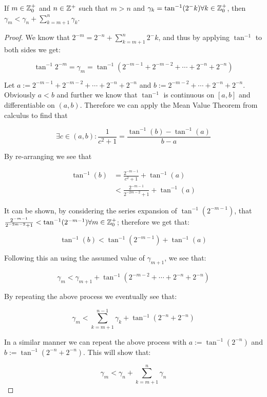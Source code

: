 {%
\begin{Cordic Gamma Property}
\label{THM_"Cordic Gamma Property"}
If \(m \in \mathbb{Z}^+_0\) and \(n \in \mathbb{Z}^+\) such that \(m > n\) and \(\gamma_k = \tan^{-1}(2^-k) \forall k \in \mathbb{Z}^+_0\), then \(\gamma_m < \gamma_n + \sum_{k=m+1}^n \gamma_k\).
\end{Cordic Gamma Property}
\begin{proof}
We know that \(2^{-m} = 2^{-n} + \sum_{k=m+1}^n 2^-k\), and thus by applying \(\tan^{-1}\) to both sides we get:

\[\tan^{-1} 2^{-m} = \gamma_m = \tan^{-1}(2^{-m-1} + 2^{-m-2} + \cdots + 2^{-n} + 2^{-n})\]

Let \(a := 2^{-m-1} + 2^{-m-2} + \cdots + 2^{-n} + 2^{-n}\) and \(b := 2^{-m-2} + \cdots + 2^{-n} + 2^{-n}\). Obviously \(a < b\) and further we know that \(\tan^{-1}\) is continuous on \([a,b]\) and differentiable on \((a,b)\). Therefore we can apply the Mean Value Theorem from calculus to find that 

\[\exists c \in (a,b) : \frac{1}{c^2 + 1} = \frac{\tan^{-1}(b) - \tan^{-1}(a)}{b-a}\]

By re-arranging we see that 

\begin{align*}
	\tan^{-1}(b) &= \frac{2^{-m-1}}{c^2 + 1} + \tan^{-1}(a)\\
		&< \frac{2^{-m-1}}{2^{-2m-2} + 1} + \tan^{-1}(a)
\end{align*}

It can be shown, by considering the series expansion of \(\tan^{-1}(2^{-m-1})\), that \(\frac{2^{-m-1}}{2^{-2m-2} + 1} < \tan^{-1}(2^{-m-1}) \forall m \in \mathbb{Z}^+_0\); therefore we get that:

\[\tan^{-1}(b) < \tan^{-1}(2^{-m-1}) + \tan^{-1}(a)\]

Following this an using the assumed value of \(\gamma_{m+1}\), we see that:

\[\gamma_m < \gamma_{m+1} + \tan^{-1}(2^{-m-2} + \cdots + 2^{-n} + 2^{-n})\]

By repeating the above process we eventually see that:

\[\gamma_m < \sum_{k=m+1}^{n-1} \gamma_k + \tan^{-1}(2^{-n} + 2^{-n})\]

In a similar manner we can repeat the above process with \(a := \tan^{-1}(2^{-n})\) and \(b := \tan^{-1}(2^{-n} + 2^{-n})\). This will show that:

\begin{displaymath}
	\gamma_m < \gamma_n + \sum_{k=m+1}^{n}\gamma_n
\end{displaymath}


\end{proof}}
